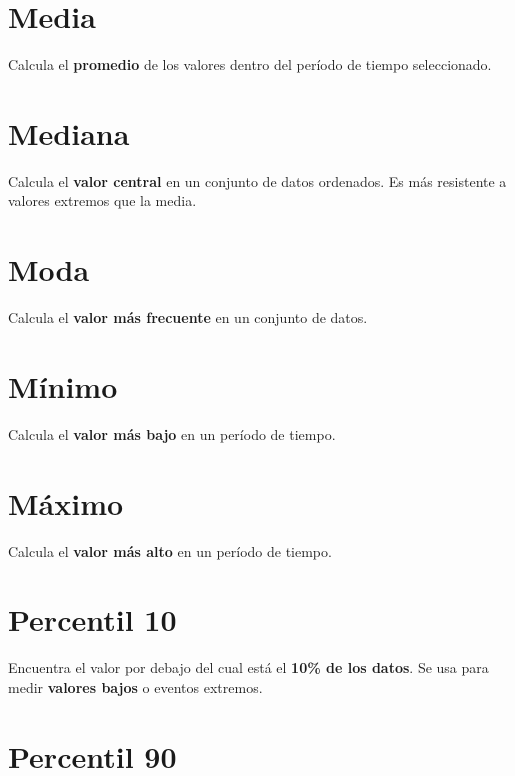 \documentclass[
]{book}
\begin{document}
\section{\texorpdfstring{\textbf{Media}}{Media}}\label{media}

Calcula el \textbf{promedio} de los valores dentro del período de tiempo seleccionado.

\section{\texorpdfstring{\textbf{Mediana}}{Mediana}}\label{mediana}

Calcula el \textbf{valor central} en un conjunto de datos ordenados. Es más resistente a valores extremos que la media.

\section{\texorpdfstring{\textbf{Moda}}{Moda}}\label{moda}

Calcula el \textbf{valor más frecuente} en un conjunto de datos.

\section{\texorpdfstring{\textbf{Mínimo}}{Mínimo}}\label{muxednimo}

Calcula el \textbf{valor más bajo} en un período de tiempo.

\section{\texorpdfstring{\textbf{Máximo}}{Máximo}}\label{muxe1ximo}

Calcula el \textbf{valor más alto} en un período de tiempo.

\section{\texorpdfstring{\textbf{Percentil 10}}{Percentil 10}}\label{percentil-10}

Encuentra el valor por debajo del cual está el \textbf{10\% de los datos}. Se usa para medir \textbf{valores bajos} o eventos extremos.

\section{\texorpdfstring{\textbf{Percentil 90}}{Percentil 90}}\label{percentil-90}
\end{document}
